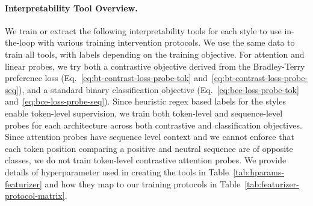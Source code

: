 \documentclass{article} %
\begin{document}
\paragraph{Interpretability Tool Overview.} We train or extract the following interpretability tools for each style to use in-the-loop with various training intervention protocols. We use the same data to train all tools, with labels depending on the training objective. For attention and linear probes, we try both a contrastive objective derived from the Bradley-Terry preference loss (Eq.~\ref{eq:bt-contrast-loss-probe-tok} and~\ref{eq:bt-contrast-loss-probe-seq}), and a standard binary classification objective (Eq.~\ref{eq:bce-loss-probe-tok} and~\ref{eq:bce-loss-probe-seq}). Since heuristic regex based labels for the styles enable token-level supervision, we train both token-level and sequence-level probes for each architecture across both contrastive and classification objectives. Since attention probes have sequence level context and we cannot enforce that each token position comparing a positive and neutral sequence are of opposite classes, we do not train token-level contrastive attention probes. We provide details of hyperparameter used in creating the tools in Table~\ref{tab:hparams-featurizer} and how they map to our training protocols in Table~\ref{tab:featurizer-protocol-matrix}.
\end{document}

